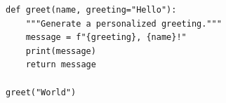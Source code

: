 \begin{listing}
    \begin{verbatim}
def greet(name, greeting="Hello"):
    """Generate a personalized greeting."""
    message = f"{greeting}, {name}!"
    print(message)
    return message

greet("World")
    \end{verbatim}
    \caption{Python code with highlighted lines.}
\end{listing}
